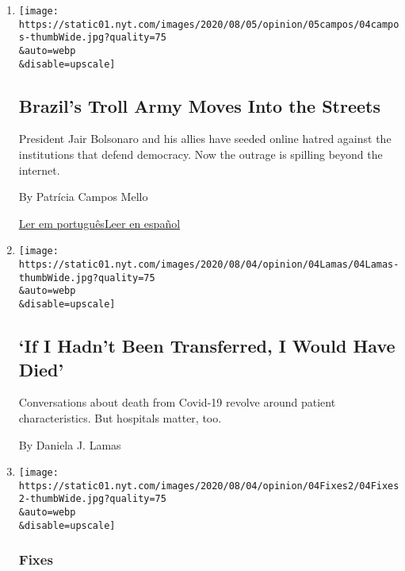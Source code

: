 \begin{enumerate}
\def\labelenumi{\arabic{enumi}.}
\item
  \href{/2020/08/04/opinion/bolsonaro-office-of-hate-brazil.html}{}

  \texttt{[image: https://static01.nyt.com/images/2020/08/05/opinion/05campos/04campos-thumbWide.jpg?quality=75\\\&auto=webp\\\&disable=upscale]}

  \hypertarget{brazils-troll-army-moves-into-the-streets}{%
  \subsection{Brazil's Troll Army Moves Into the
  Streets}\label{brazils-troll-army-moves-into-the-streets}}

  President Jair Bolsonaro and his allies have seeded online hatred
  against the institutions that defend democracy. Now the outrage is
  spilling beyond the internet.

  By Patrícia Campos Mello

  \href{https://www.nytimes.com/pt/2020/08/04/opinion/international-world/bolsonaro-gabinete-do-odio.html}{Ler
  em
  português}\href{https://www.nytimes.com/es/2020/08/04/espanol/opinion/bolsonaro-oficina-odio-brasil.html}{Leer
  en español}
\item
  \href{/2020/08/04/opinion/covid-rural-hospitals.html}{}

  \texttt{[image: https://static01.nyt.com/images/2020/08/04/opinion/04Lamas/04Lamas-thumbWide.jpg?quality=75\\\&auto=webp\\\&disable=upscale]}

  \hypertarget{if-i-hadnt-been-transferred-i-would-have-died}{%
  \subsection{`If I Hadn't Been Transferred, I Would Have
  Died'}\label{if-i-hadnt-been-transferred-i-would-have-died}}

  Conversations about death from Covid-19 revolve around patient
  characteristics. But hospitals matter, too.

  By Daniela J. Lamas
\item
  \href{/2020/08/04/opinion/opioid-telemedicine-covid.html}{}

  \texttt{[image: https://static01.nyt.com/images/2020/08/04/opinion/04Fixes2/04Fixes2-thumbWide.jpg?quality=75\\\&auto=webp\\\&disable=upscale]}

  \hypertarget{fixes}{%
  \subsubsection{Fixes}\label{fixes}}


\end{enumerate}
